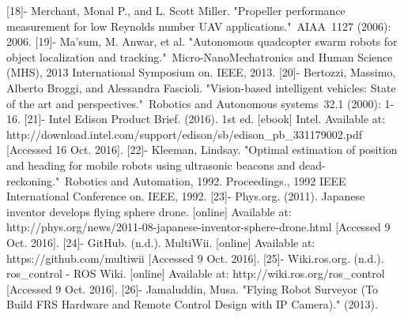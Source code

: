 \documentclass[12pt]{article}
\begin{document}
[18]- Merchant, Monal P., and L. Scott Miller. "Propeller performance measurement for low Reynolds number UAV applications." AIAA 1127 (2006): 2006.
[19]- Ma'sum, M. Anwar, et al. "Autonomous quadcopter swarm robots for object localization and tracking." Micro-NanoMechatronics and Human Science (MHS), 2013 International Symposium on. IEEE, 2013.
[20]- Bertozzi, Massimo, Alberto Broggi, and Alessandra Fascioli. "Vision-based intelligent vehicles: State of the art and perspectives." Robotics and Autonomous systems 32.1 (2000): 1-16.
[21]- Intel Edison Product Brief. (2016). 1st ed. [ebook] Intel. Available at: http://download.intel.com/support/edison/sb/edison_pb_331179002.pdf [Accessed 16 Oct. 2016].
[22]- Kleeman, Lindsay. "Optimal estimation of position and heading for mobile robots using ultrasonic beacons and dead-reckoning." Robotics and Automation, 1992. Proceedings., 1992 IEEE International Conference on. IEEE, 1992.
[23]- Phys.org. (2011). Japanese inventor develops flying sphere drone. [online] Available at: http://phys.org/news/2011-08-japanese-inventor-sphere-drone.html [Accessed 9 Oct. 2016].
[24]-  GitHub. (n.d.). MultiWii. [online] Available at: https://github.com/multiwii [Accessed 9 Oct. 2016].
[25]- Wiki.ros.org. (n.d.). ros_control - ROS Wiki. [online] Available at: http://wiki.ros.org/ros_control [Accessed 9 Oct. 2016].
[26]- Jamaluddin, Musa. "Flying Robot Surveyor (To Build FRS Hardware and Remote Control Design with IP Camera)." (2013).
\end{document}
